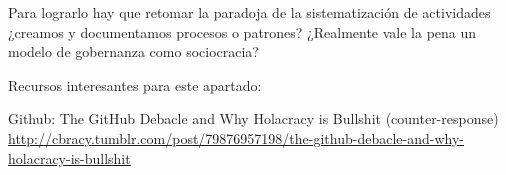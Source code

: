 Para lograrlo hay que retomar la paradoja de la sistematización de actividades ¿creamos y documentamos procesos o patrones? ¿Realmente vale la pena un modelo de gobernanza como sociocracia?

Recursos interesantes para este apartado:

Github: The GitHub Debacle and Why Holacracy is Bullshit
(counter-response)
\url{http://cbracy.tumblr.com/post/79876957198/the-github-debacle-and-why-holacracy-is-bullshit}

